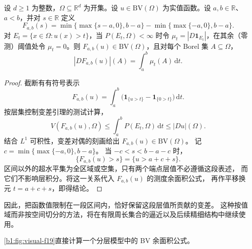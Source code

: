 \begin{proposition}[截断的变差分层]\label{b1:prop:bv-truncation-coarea}
设 \(d\ge1\) 为整数，\(\Omega\subseteq\mathbb R^d\) 为开集。设 \(u\in\mathrm{BV}(\Omega)\) 为实值函数。设 \(a,b\in\mathbb R\)、\(a<b\)，并对 \(s\in\mathbb R\) 定义
\[
 F_{a,b}(s)=\min\{\max\{s-a,0\},b-a\}
              -\min\{\max\{-a,0\},b-a\}.
\]
对 \(E_t=\{x\in\Omega:u(x)>t\}\)，当 \(P(E_t,\Omega)<\infty\) 时令 \(\mu_t=|D\mathbf1_{E_t}|\)，在其余（零测）阈值处令 \(\mu_t=0\)。则 \(F_{a,b}(u)\in \mathrm{BV}(\Omega)\)，且对每个 Borel 集
\(A\subseteq\Omega\)，
\[
 |D F_{a,b}(u)|(A)=\int_a^b\mu_t(A)\,\mathrm dt.
\]
\end{proposition}
\begin{proof}
截断有有符号表示
\[
 F_{a,b}(u)=\int_a^b
      \bigl(\mathbf1_{\{u>t\}}-\mathbf1_{\{0>t\}}\bigr)\,\mathrm dt.
\]
按层集控制变差引理的测试计算，
\[
 V(F_{a,b}(u),\Omega)\le\int_a^bP(E_t,\Omega)\,\mathrm dt
       \le|Du|(\Omega).
\]
结合 \(L^1\) 可积性，变差对偶的刻画给出 \(F_{a,b}(u)\in \mathrm{BV}(\Omega)\)。
记 \(c=\min\bigl\{\max\{-a,0\},b-a\bigr\}\)。
当 \(-c<s<b-a-c\) 时，
\[
 \{F_{a,b}(u)>s\}=\{u>a+c+s\}.
\]
区间以外的超水平集为全区域或空集，只有两个端点层值不必遵循这段表述，
而它们不影响层积分。将这一关系代入 \(F_{a,b}(u)\) 的测度余面积公式，
再作平移换元 \(t=a+c+s\)，即得结论。
\end{proof}

因此，把函数值限制在一段区间内，恰好保留这段层值所贡献的变差。
这种按值域而非按空间切分的方法，将在有限周长集合的逼近以及后续精细结构中继续使用。

\cref{b1:fig:visual-f19}直接计算一个分层模型中的 BV 余面积公式。


